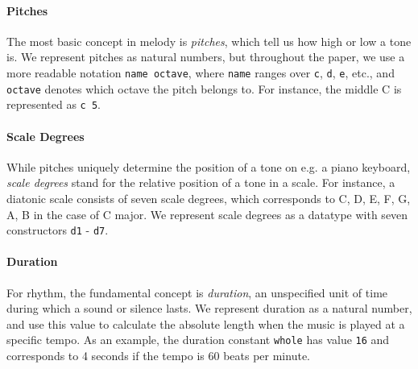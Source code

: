 \paragraph{Pitches}

The most basic concept in melody is \emph{pitches}, which tell us
how high or low a tone is.
We represent pitches as natural numbers, but throughout the paper,
we use a more readable notation \texttt{name octave}, where
\texttt{name} ranges over \texttt{c}, \texttt{d}, \texttt{e}, etc.,
and \texttt{octave} denotes which octave the pitch belongs to.
For instance, the middle C is represented as \texttt{c 5}.




\paragraph{Scale Degrees}

While pitches uniquely determine the position of a tone on e.g.
a piano keyboard, \emph{scale degrees} stand for the relative position
of a tone in a scale.
For instance, a diatonic scale consists of seven scale degrees, which
corresponds to C, D, E, F, G, A, B in the case of C major.
We represent scale degrees as a datatype with seven constructors
\texttt{d1} - \texttt{d7}.

\paragraph{Duration}

For rhythm, the fundamental concept is \emph{duration}, an
unspecified unit of time during which a sound or silence lasts.
We represent duration as a natural number, and use this value to
calculate the absolute length when the music is played at a specific
tempo.
As an example, the duration constant \texttt{whole} has value
\texttt{16} and corresponds to 4 seconds if the tempo is 60 beats
per minute.


